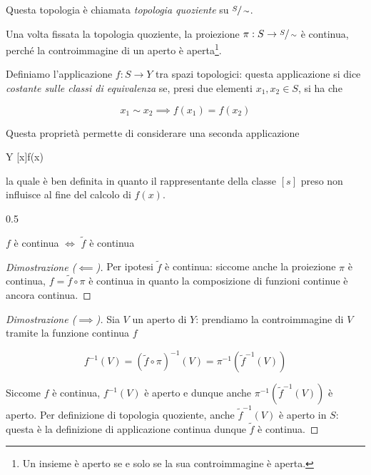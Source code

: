 Questa topologia è chiamata \textit{topologia quoziente} su $ \sfrac{S}{\sim} $.

\begin{remark}
	Una volta fissata la topologia quoziente, la proiezione $ \pi : S \to \sfrac{S}{\sim} $ è continua, perché la controimmagine di un aperto è aperta\footnote{%
		Un insieme è aperto se e solo se la sua controimmagine è aperta.%
	}.
\end{remark}

Definiamo l'applicazione $ f : S \to Y $ tra spazi topologici: questa applicazione si dice \textit{costante sulle classi di equivalenza} se, presi due elementi $ x_{1}, x_{2} \in S $, si ha che

\begin{equation}
	x_{1} \sim x_{2} \implies f(x_{1}) = f(x_{2})
\end{equation}

Questa proprietà permette di considerare una seconda applicazione

	{}{Y}
	{[x]}{f(x)}

la quale è ben definita in quanto il rappresentante della classe $ [s] $ preso non influisce al fine del calcolo di $ f(x) $.

	{0.5}{%
			}

\begin{definition}
	$ f $ è continua $ \iff $ $ \tilde{f} $ è continua
\end{definition}

\begin{proof}[Dimostrazione ($ \impliedby $)]
	Per ipotesi  $ \tilde{f} $ è continua: siccome anche la proiezione $ \pi $ è continua, $ f = \tilde{f} \circ \pi $ è continua in quanto la composizione di funzioni continue è ancora continua.
\end{proof}

\begin{proof}[Dimostrazione ($ \implies $)]
	Sia $ V $ un aperto di $ Y $: prendiamo la controimmagine di $ V $ tramite la funzione continua $ f $
	
	\begin{equation}
			f^{-1}(V) = (\tilde{f} \circ \pi)^{-1}(V) = \pi^{-1}(\tilde{f}^{-1}(V))
	\end{equation}

	Siccome $ f $ è continua, $ f^{-1}(V) $ è aperto e dunque anche $ \pi^{-1}(\tilde{f}^{-1}(V)) $ è aperto. Per definizione di topologia quoziente, anche $ \tilde{f}^{-1}(V) $ è aperto in $ S $: questa è la definizione di applicazione continua dunque $ \tilde{f} $ è continua.
\end{proof}

